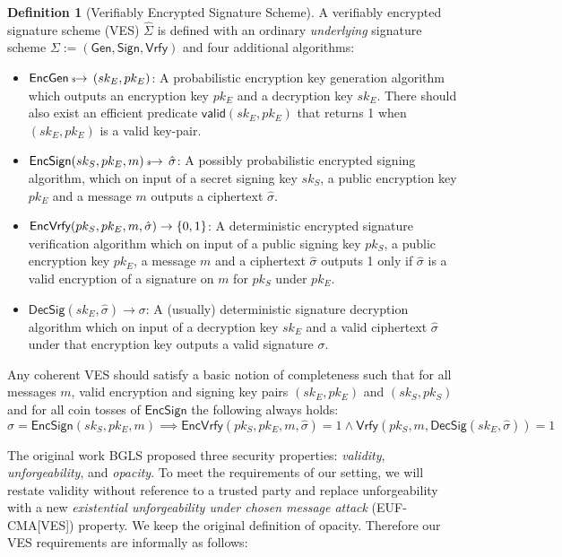 \documentclass[fullpage]{article}
\theoremstyle{definition}
\newtheorem{definition}{Definition}[section]
\newcommand{\EUFCMAVES}{\textsf{EUF-CMA}[\textsf{VES}]\xspace}
\newcommand{\EncGen}{\textsf{EncGen}}
\newcommand{\EncSign}{\textsf{EncSign}}
\newcommand{\EncVer}{\textsf{EncVrfy}}
\newcommand{\DecSig}{\textsf{DecSig}}
\newcommand{\KeyGen}{\textsf{Gen}}
\newcommand{\Sign}{\textsf{Sign}}
\newcommand{\Verify}{\textsf{Vrfy}}
\newcommand{\SIGNALG}{\KeyGen, \Sign, \Verify}
\newcommand{\skSign}{sk_S}
\newcommand{\pkSign}{pk_S}
\newcommand{\kSign}{(\skSign,\pkSign)}
\newcommand{\skEnc}{sk_E}
\newcommand{\pkEnc}{pk_E}
\newcommand{\kEnc}{(\skEnc, \pkEnc)}
\newcommand{\hatsigma}{\hat{\sigma}}
\newcommand{\hatSigma}{\hat{\Sigma}}
\begin{document}
\begin{definition}[Verifiably Encrypted Signature Scheme]
\label{VES}
 A verifiably encrypted signature scheme (VES) $\hatSigma$ is defined with an ordinary \emph{underlying} signature scheme $\Sigma := (\SIGNALG)$ and four additional algorithms:
    \begin{itemize}
        \item $\EncGen \rightsample \kEnc$: A probabilistic encryption key generation algorithm which outputs an encryption key $\pkEnc$ and a decryption key $\skEnc$. There should also exist an efficient predicate $\textsf{valid}\kEnc$ that returns 1 when $\kEnc$ is a valid key-pair.
        \item $\EncSign(\skSign, \pkEnc, m) \rightsample \hatsigma$: A possibly probabilistic encrypted signing algorithm, which on input of a secret signing key $\skSign$, a public encryption key $\pkEnc$ and a message $m$ outputs a ciphertext $\hatsigma$.
        \item $\EncVer(\pkSign, \pkEnc, m, \hatsigma) \rightarrow \bin$: A deterministic encrypted signature verification algorithm which on input of a public signing key $\pkSign$, a public encryption key $\pkEnc$, a message $m$ and a ciphertext $\hatsigma$ outputs 1 only if $\hatsigma$ is a valid encryption of a signature on $m$ for $\pkSign$ under $\pkEnc$.
        \item $\DecSig(\skEnc, \hatsigma) \rightarrow \sigma$: A (usually) deterministic signature decryption algorithm which on input of a decryption key $\skEnc$ and a valid ciphertext $\hatsigma$ under that encryption key  outputs a valid signature $\sigma$.
    \end{itemize}

Any coherent VES should satisfy a basic notion of completeness such that for all messages $m$, valid encryption and signing key pairs $\kEnc$ and $\kSign$ and for all coin tosses of $\EncSign$ the following always holds:
    \[ \hatsigma = \EncSign(\skSign, \pkEnc, m) \implies \EncVer(\pkSign, \pkEnc, m, \hatsigma) = 1 \land \Verify(\pkSign, m, \DecSig(\skEnc, \hatsigma)) = 1 \]
\end{definition}

The original work BGLS proposed three security properties: \emph{validity}, \emph{unforgeability}, and \emph{opacity}. To meet the requirements of our setting, we will restate validity without reference to a trusted party and replace unforgeability with a new \emph{existential unforgeability under chosen message attack} (\EUFCMAVES) property. We keep the original definition of opacity. Therefore our VES requirements are informally as follows:
\end{document}
